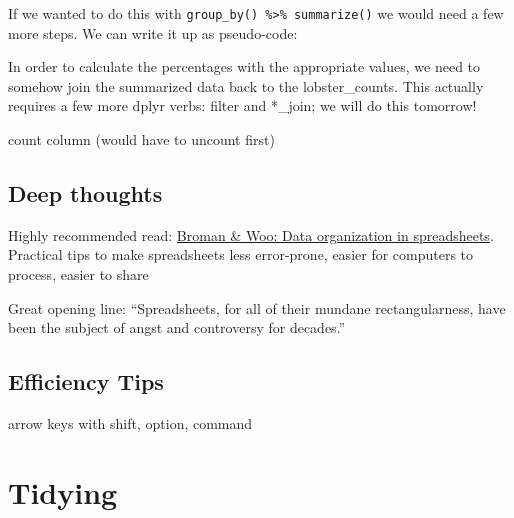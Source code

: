 \documentclass[]{book}
\newenvironment{Shaded}{\begin{snugshade}}{\end{snugshade}}
\newcommand{\CommentTok}[1]{\textcolor[rgb]{0.56,0.35,0.01}{\textit{#1}}}
\newcommand{\DataTypeTok}[1]{\textcolor[rgb]{0.13,0.29,0.53}{#1}}
\newcommand{\DecValTok}[1]{\textcolor[rgb]{0.00,0.00,0.81}{#1}}
\newcommand{\KeywordTok}[1]{\textcolor[rgb]{0.13,0.29,0.53}{\textbf{#1}}}
\newcommand{\NormalTok}[1]{#1}
\newcommand{\OperatorTok}[1]{\textcolor[rgb]{0.81,0.36,0.00}{\textbf{#1}}}
\newcommand{\StringTok}[1]{\textcolor[rgb]{0.31,0.60,0.02}{#1}}
\begin{document}
If we wanted to do this with \texttt{group\_by()\ \%\textgreater{}\%\ summarize()} we would need a few more steps. We can write it up as pseudo-code:

\begin{Shaded}
\end{Shaded}

In order to calculate the percentages with the appropriate values, we need to somehow join the summarized data back to the lobster\_counts. This actually requires a few more dplyr verbs: filter and *\_join; we will do this tomorrow!

count column (would have to uncount first)

\hypertarget{deep-thoughts-2}{%
\section{Deep thoughts}\label{deep-thoughts-2}}

Highly recommended read: \href{https://peerj.com/preprints/3183/}{Broman \& Woo: Data organization in spreadsheets}. Practical tips to make spreadsheets less error-prone, easier for computers to process, easier to share

Great opening line: ``Spreadsheets, for all of their mundane rectangularness, have been the subject of angst and controversy for decades.''

\hypertarget{efficiency-tips-5}{%
\section{Efficiency Tips}\label{efficiency-tips-5}}

arrow keys with shift, option, command

\hypertarget{tidying}{%
\chapter{Tidying}\label{tidying}}
\end{document}
